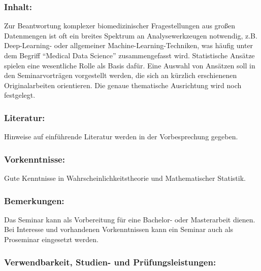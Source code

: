 \documentclass[a4paper,10pt]{article}
\begin{document}
\subsubsection*{\large
    Inhalt:
}
Zur Beantwortung komplexer biomedizinischer Fragestellungen aus großen Datenmengen ist oft ein breites Spektrum an Analysewerkzeugen notwendig, z.B. Deep-Learning- oder allgemeiner Machine-Learning-Techniken, was häufig unter dem Begriff "`Medical Data Science"' zusammengefasst wird. Statistische Ansätze spielen eine wesentliche Rolle als Basis dafür. Eine Auswahl von Ansätzen soll in den Seminarvorträgen vorgestellt werden, die sich an kürzlich erschienenen Originalarbeiten orientieren. Die genaue thematische Ausrichtung wird noch festgelegt.
\subsubsection*{\large
    Literatur:
}
Hinweise auf einführende Literatur werden in der Vorbesprechung gegeben.
\subsubsection*{\large
    Vorkenntnisse:
}
Gute Kenntnisse in Wahrscheinlichkeitstheorie und Mathematischer Statistik.
\subsubsection*{\large
    Bemerkungen:
}
Das Seminar kann als Vorbereitung für eine Bachelor- oder Masterarbeit dienen.\\
Bei Interesse und vorhandenen Vorkenntnissen kann ein Seminar auch als Proseminar eingesetzt werden.
\cleardoublepage
\subsubsection*{\large
    Verwendbarkeit, Studien- und Prüfungsleistungen:
}
\end{document}
